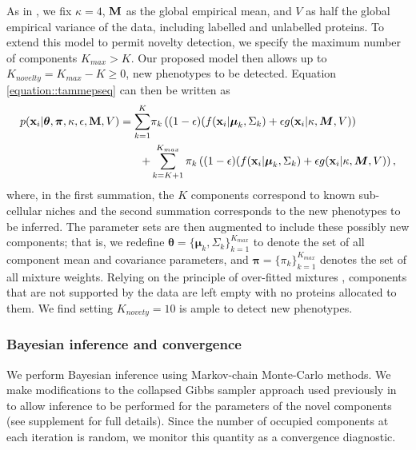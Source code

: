 \documentclass[12pt,english]{article}
\begin{document}
As in \cite{Crook:2018}, we fix $\kappa = 4$, ${\bf M}$ as the global empirical mean, and $V$
as half the global empirical variance of the data, including labelled and unlabelled proteins. To extend this model to permit novelty detection, we specify the maximum number of components $K_{max} > K$. Our proposed model then allows up to $K_{novelty} = K_{max} - K \geq 0$, new phenotypes to be detected. Equation \ref{equation::tammepseq} can then be written as 
\begin{equation}\label{equation::tammepseq2}
\begin{split}
p({\bf x}_i| \boldsymbol{\theta}, \boldsymbol{\pi} , \kappa, \epsilon, {\bf M}, V) =  \sum_{k=1}^{K}&\pi_k\left((1-\epsilon)(f({\bf x}_i |\boldsymbol{\mu}_k, \Sigma_k) + \epsilon g({\bf x}_i|\kappa, \boldsymbol{M}, V)\right)\\
+ & \sum_{k=K+1}^{K_{max}}\pi_k\left((1-\epsilon)(f({\bf x}_i |\boldsymbol{\mu}_k, \Sigma_k) + \epsilon g({\bf x}_i|\kappa, \boldsymbol{M}, V)\right),
\end{split}
\end{equation}
where, in the first summation, the $K$ components correspond to known sub-cellular niches and the second summation corresponds to the new phenotypes to be inferred. The parameter sets are then augmented to include these possibly new components; that is, we redefine 
$\boldsymbol{\theta} = \{\boldsymbol{\mu}_k, \Sigma_k \}_{k = 1}^{K_{max}}$
to denote the set of all component mean and covariance parameters, and
$\boldsymbol{\pi} = \{\pi_k\}_{k = 1}^{K_{max}}$ denotes the set of all mixture
weights. Relying on the principle of over-fitted mixtures \citep{Rousseau::2011}, components that are not supported by the data are left empty with no proteins allocated to them. We find setting $K_{novety} = 10$ is ample to detect new phenotypes.   
\subsubsection{Bayesian inference and convergence}
We perform Bayesian inference using Markov-chain Monte-Carlo methods. We make modifications to the collapsed Gibbs sampler approach used previously in \cite{Crook:2018} to allow inference to be performed for the parameters of the novel components (see supplement for full details). Since the number of occupied components at each iteration is random, we monitor this quantity as a convergence diagnostic.
\end{document}
